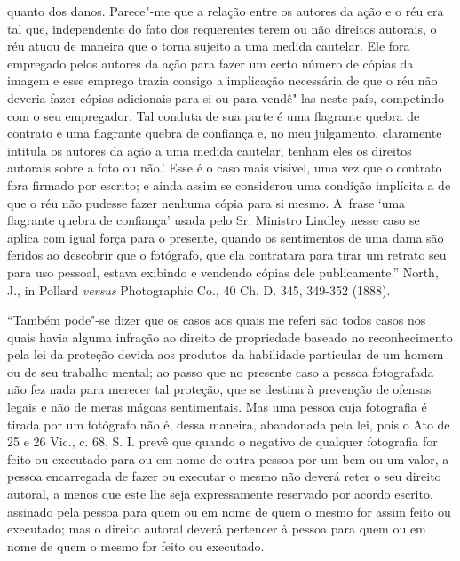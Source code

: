 {  quanto dos danos. Parece"-me que a relação entre os autores da ação e o
  réu era tal que, independente do fato dos requerentes terem ou não
  direitos autorais, o réu atuou de maneira que o torna sujeito a uma
  medida cautelar. Ele fora empregado pelos autores da ação para fazer
  um certo número de cópias da imagem e esse emprego trazia consigo a
  implicação necessária de que o réu não deveria fazer cópias adicionais
  para si ou para vendê"-las neste país, competindo com o seu empregador.
  Tal conduta de sua parte é uma flagrante quebra de contrato e uma
  flagrante quebra de confiança e, no meu julgamento, claramente
  intitula os autores da ação a uma medida cautelar, tenham eles os
  direitos autorais sobre a foto ou não.' Esse é o caso mais visível,
  uma vez que o contrato fora firmado por escrito; e ainda assim se
  considerou uma condição implícita a de que o réu não pudesse fazer
  nenhuma cópia para si mesmo. A~frase `uma flagrante quebra de
  confiança' usada pelo Sr. Ministro Lindley nesse caso se aplica com
  igual força para o presente, quando os sentimentos de uma dama são
  feridos ao descobrir que o fotógrafo, que ela contratara para tirar um
  retrato seu para uso pessoal, estava exibindo e vendendo cópias dele
  publicamente.'' North, J., in Pollard \emph{versus} Photographic Co.,
  40 Ch. D. 345, 349-352 (1888).

  ``Também pode"-se dizer que os casos aos quais me referi são todos
  casos nos quais havia alguma infração ao direito de propriedade
  baseado no reconhecimento pela lei da proteção devida aos produtos da
  habilidade particular de um homem ou de seu trabalho mental; ao passo
  que no presente caso a pessoa fotografada não fez nada para merecer
  tal proteção, que se destina à prevenção de ofensas legais e não de
  meras mágoas sentimentais. Mas uma pessoa cuja fotografia é tirada por
  um fotógrafo não é, dessa maneira, abandonada pela lei, pois o Ato de
  25 e 26 Vic., c. 68, S. I. prevê que quando o negativo de qualquer
  fotografia for feito ou executado para ou em nome de outra pessoa por
  um bem ou um valor, a pessoa encarregada de fazer ou executar o mesmo
  não deverá reter o seu direito autoral, a menos que este lhe seja
  expressamente reservado por acordo escrito, assinado pela pessoa para
  quem ou em nome de quem o mesmo for assim feito ou executado; mas o
  direito autoral deverá pertencer à pessoa para quem ou em nome de quem
  o mesmo for feito ou executado.

}
